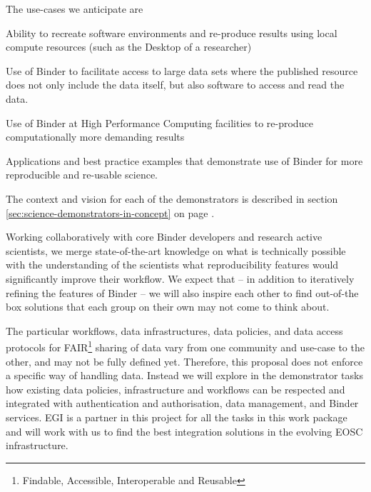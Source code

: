 \begin{workpackage}[
  id=applications,
  wphases=0-36!1,
  swsites,
  title=Applications and use cases,
  short=Applications,
  lead=MP,
  MPRM=9,
  SRLRM=9,
  UIORM=8,
  IFRRM=8
]
\begin{wpdescription}
  The use-cases we anticipate are
  \begin{compactitem}
  \item {} Ability to recreate software environments
    and re-produce results using local compute resources (such as the Desktop of
    a researcher)
  \item {} Use of Binder to facilitate access to
    large data sets where the published resource does not only include the data
    itself, but also software to access and read the data.
  \item {} Use of Binder at High Performance Computing
    facilities to re-produce computationally more demanding results
    \item {} Applications and best practice examples that
    demonstrate use of Binder for more reproducible and re-usable science.
  \end{compactitem}

  The context and vision for each of the demonstrators is described in
  section \ref{sec:science-demonstrators-in-concept} on page
  \pageref{sec:science-demonstrators-in-concept}.

  Working collaboratively with core Binder developers and research active
  scientists, we merge state-of-the-art knowledge on what is technically
  possible with the understanding of the scientists what reproducibility
  features would significantly improve their workflow. We expect that -- in
  addition to iteratively refining the features of Binder -- we will also
  inspire each other to find out-of-the box solutions that each group on
  their own may not come to think about.

  \medskip

  The particular workflows, data infrastructures, data policies, and data access
  protocols for
  FAIR\footnote{Findable, Accessible, Interoperable and Reusable} sharing of data vary from one community and use-case to
  the other, and may not be fully defined yet. Therefore, this proposal
  does not enforce a specific way of handling data. Instead we
  will explore in the demonstrator tasks how existing data policies,
  infrastructure and workflows can be respected and integrated with
  authentication and authorisation, data management, and
  Binder services. EGI is a partner in this project 
  for all the tasks in this work package and will work with us to find the
  best integration solutions in the evolving EOSC infrastructure.


\end{wpdescription}
\end{workpackage}
